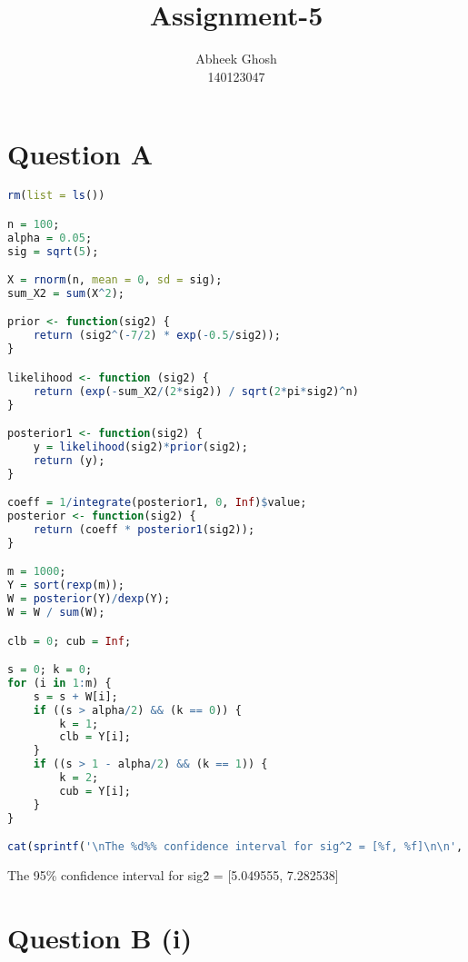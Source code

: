 \documentclass{article}
\begin{document}
	\title{\textbf{Assignment-5}}
	\author{Abheek Ghosh \\ 
		140123047 }
	
	\maketitle
	

\section{Question A}


\begin{lstlisting}[language=R]
rm(list = ls())

n = 100;
alpha = 0.05;
sig = sqrt(5);

X = rnorm(n, mean = 0, sd = sig);
sum_X2 = sum(X^2);

prior <- function(sig2) {
	return (sig2^(-7/2) * exp(-0.5/sig2));
}

likelihood <- function (sig2) {
	return (exp(-sum_X2/(2*sig2)) / sqrt(2*pi*sig2)^n)
}

posterior1 <- function(sig2) {
	y = likelihood(sig2)*prior(sig2);
	return (y);
}

coeff = 1/integrate(posterior1, 0, Inf)$value;
posterior <- function(sig2) {
	return (coeff * posterior1(sig2));
}

m = 1000;
Y = sort(rexp(m));
W = posterior(Y)/dexp(Y);
W = W / sum(W);

clb = 0; cub = Inf;

s = 0; k = 0;
for (i in 1:m) {
	s = s + W[i];
	if ((s > alpha/2) && (k == 0)) {
		k = 1;
		clb = Y[i];
	}
	if ((s > 1 - alpha/2) && (k == 1)) {
		k = 2;
		cub = Y[i];
	}
}

cat(sprintf('\nThe %d%% confidence interval for sig^2 = [%f, %f]\n\n', 100*(1-alpha), clb, cub));
\end{lstlisting}

The 95\% confidence interval for sig\^2 = [5.049555, 7.282538]\\

\section{Question B (i)}

\end{document}
